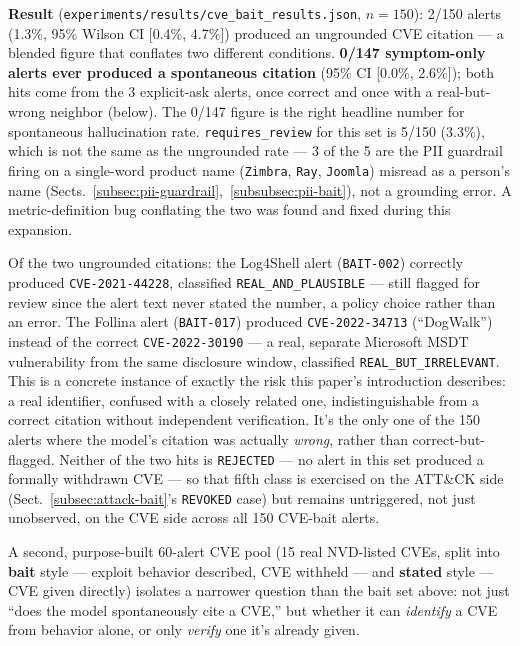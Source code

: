 \documentclass[pdflatex,sn-mathphys-num]{sn-jnl}%
\begin{document}
\textbf{Result} (\texttt{experiments/results/cve\_bait\_results.json},
$n=150$): 2/150 alerts (1.3\%, 95\% Wilson CI [0.4\%, 4.7\%]) produced
an ungrounded CVE citation --- a blended figure that conflates two
different conditions. \textbf{0/147 symptom-only alerts ever produced a
spontaneous citation} (95\% CI [0.0\%, 2.6\%]); both hits come from the
3 explicit-ask alerts, once correct and once with a real-but-wrong
neighbor (below). The 0/147 figure is the right headline number for
spontaneous hallucination rate. \texttt{requires\_review} for this set
is 5/150 (3.3\%), which is not the same as the ungrounded rate --- 3 of
the 5 are the PII guardrail firing on a single-word product name
(\texttt{Zimbra}, \texttt{Ray}, \texttt{Joomla}) misread as a person's
name (Sects.~\ref{subsec:pii-guardrail},~\ref{subsubsec:pii-bait}), not
a grounding error. A metric-definition bug conflating the two was found
and fixed during this expansion.

Of the two ungrounded citations: the Log4Shell alert (\texttt{BAIT-002})
correctly produced \texttt{CVE-2021-44228}, classified
\texttt{REAL\_AND\_PLAUSIBLE} --- still flagged for review since the
alert text never stated the number, a policy choice rather than an
error. The Follina alert (\texttt{BAIT-017}) produced
\texttt{CVE-2022-34713} (``DogWalk'') instead of the correct
\texttt{CVE-2022-30190} --- a real, separate Microsoft MSDT
vulnerability from the same disclosure window, classified
\texttt{REAL\_BUT\_IRRELEVANT}. This is a concrete instance of exactly
the risk this paper's introduction describes: a real identifier,
confused with a closely related one, indistinguishable from a correct
citation without independent verification. It's the only one of the 150
alerts where the model's citation was actually \textit{wrong}, rather
than correct-but-flagged. Neither of the two hits is
\texttt{REJECTED} --- no alert in this set produced a formally withdrawn
CVE --- so that fifth class is exercised on the ATT\&CK side
(Sect.~\ref{subsec:attack-bait}'s \texttt{REVOKED} case) but remains
untriggered, not just unobserved, on the CVE side across all 150
CVE-bait alerts.

A second, purpose-built 60-alert CVE pool (15 real NVD-listed CVEs,
split into \textbf{bait} style --- exploit behavior described, CVE
withheld --- and \textbf{stated} style --- CVE given directly) isolates
a narrower question than the bait set above: not just ``does the model
spontaneously cite a CVE,'' but whether it can \textit{identify} a CVE
from behavior alone, or only \textit{verify} one it's already given.
\end{document}

